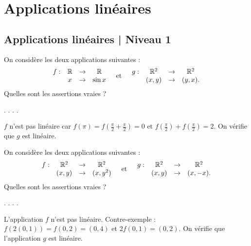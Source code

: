 


\section{Applications linéaires }
\subsection{Applications linéaires | Niveau 1}

\begin{question}
On considère les deux applications suivantes : 
$$\begin{array}{rccc}f:&\mathbb{R}&\to&\mathbb{R}\\
& x&\to & \sin x \end{array} \quad \mbox{et} \quad \begin{array}{rccc}g:&\mathbb{R}^2&\to&\mathbb{R}^2\\
& (x,y)&\to &(y,x). \end{array}$$ 
Quelles sont les assertions vraies ?
\begin{answers}  
.
.
.
.
\end{answers}
\begin{explanations} $f$ n'est pas linéaire car $f(\pi)=f(\frac{\pi}{2}+ \frac{\pi}{2})=0$ 
et $f(\frac{\pi}{2})+ f(\frac{\pi}{2}) =2$. 
On vérifie que $g$ est linéaire.  
\end{explanations}
\end{question}


\begin{question}
On considère les deux applications suivantes : 
$$\begin{array}{rccc}f:&\mathbb{R}^2&\to&\mathbb{R}^2\\
& (x,y)&\to & (x,y^2) \end{array} \quad \mbox{et} \quad \begin{array}{rccc}g:&\mathbb{R}^2&\to&\mathbb{R}^2\\
& (x,y)&\to &(x,-x). \end{array}$$ 
Quelles sont les assertions vraies ?
\begin{answers}  
.
.
.
.
\end{answers}
\begin{explanations} L'application $f$ n'est pas linéaire. Contre-exemple : $f(2(0,1))=f(0,2)=(0,4)$ et $2f(0,1)=(0,2)$. On vérifie que l'application $g$ est linéaire.
\end{explanations}
\end{question}



